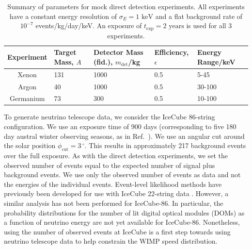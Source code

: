 \begin{table}[t]
  \setlength{\extrarowheight}{2pt}
  \begin{center}
	\begin{tabular}{c|m{1.2cm}m{2.2cm}m{2cm}m{2.1cm}}
        \hline\hline
	Experiment  & Target Mass, $A$ & Detector Mass (fid.), $m_\textrm{det}$/kg & Efficiency, $\epsilon$ & Energy Range/keV\\
	\hline
	Xenon  & 131  & 1000 & 0.5  & 5-45 \\
	Argon  & 40  & 1000 & 0.5  & 30-100  \\
        Germanium  & 73  & 300  & 0.5  & 10-100 \\
        \hline\hline
	\end{tabular}
  \end{center}
\caption[Summary of parameters for mock direct detection experiments used in Chapter~\ref{ch:NT}]{Summary of parameters for mock direct detection experiments. All experiments have a constant energy resolution of $\sigma_E = 1 \textrm{ keV}$ and a flat background rate of $10^{-7}$ events/kg/day/keV. An exposure of $t_\textrm{exp} = 2 \textrm{ years}$ is used for all 3 experiments.}
\label{tab:NT:experiments}
\end{table}


To generate neutrino telescope data, we consider the IceCube 86-string configuration. We use an exposure time of 900 days (corresponding to five 180 day austral winter observing seasons, as in Ref.~\cite{Arina:2013}). We use an angular cut around the solar position $\phi_\textrm{cut} = 3\,^{\circ}$. This results in approximately 217 background events over the full exposure. As with the direct detection experiments, we set the observed number of events equal to the expected number of signal plus background events. We use only the observed number of events as data and not the energies of the individual events. Event-level likelihood methods have previously been developed \cite{Scott:2012} for use with IceCube 22-string data \cite{Abbasi:2009}. However, a similar analysis has not been performed for IceCube-86. In particular, the probability distributions for the number of lit digital optical modules (DOMs) as a function of neutrino energy are not yet available for IceCube-86. Nonetheless, using the number of observed events at IceCube is a first step towards using neutrino telescope data to help constrain the WIMP speed distribution.

